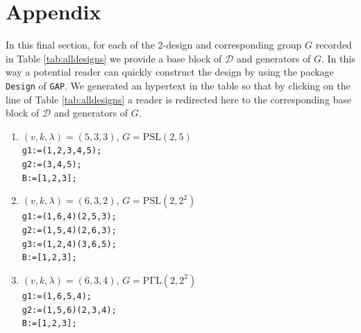 \documentclass[a4paper,twopage,reqno,12pt]{amsart}
\theoremstyle{definition}
\numberwithin{equation}{section}
\newcommand{\PSL}{\mathrm{PSL}}
\newcommand{\PGL}{\mathrm{PGL}}
\newcommand{\PGaL}{\mathrm{P\Gamma L}}
\newcommand{\PSigL}{\mathrm{P\Sigma L}}
\newcommand{\Aut}{\mathrm{Aut}}
\begin{document}
\section{Appendix}\label{Appendix}
In this final section, for each of the $2$-design and corresponding group $G$ recorded in Table \ref{tab:alldesigns} we provide a base block of $\mathcal{D}$ and generators of $G$. In this way a potential reader can quickly construct the design by using the package \texttt{Design} of \texttt{GAP}. We generated an hypertext in the table so that by clicking on the line of Table \ref{tab:alldesigns} a reader is redirected here to the corresponding base block of $\mathcal{D}$ and generators of $G$. 

\begin{enumerate}
    \item\label{533} $(v,k,\lambda)=(5,3,3)$, $G=\PSL(2,5)$\\
    \texttt{g1:=(1,2,3,4,5);}\\
    \texttt{g2:=(3,4,5);}\\
    \texttt{B:=[1,2,3];}\\

    \item\label{632} $(v,k,\lambda)=(6,3,2)$, $G=\PSL(2,2^2)$ \\
    \texttt{g1:=(1,6,4)(2,5,3);}\\
    \texttt{g2:=(1,5,4)(2,6,3);}\\
    \texttt{g3:=(1,2,4)(3,6,5);}\\
    \texttt{B:=[1,2,3];}\\

    \item\label{634_1} $(v,k,\lambda)=(6,3,4)$, $G=\PGaL(2,2^2)$ \\
    \texttt{g1:=(1,6,5,4);}\\
    \texttt{g2:=(1,5,6)(2,3,4);}\\
    \texttt{B:=[1,2,3];}\\



\end{enumerate}
\end{document}
